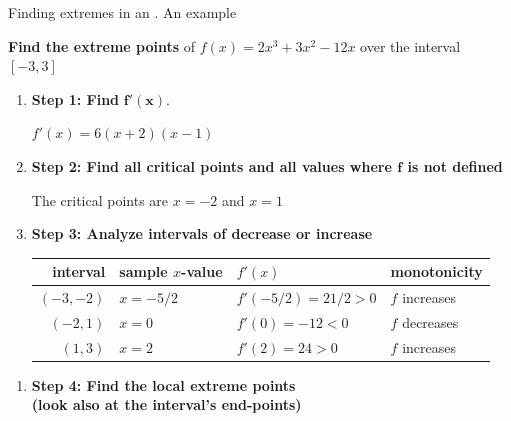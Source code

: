 \documentclass[9pt]{beamer}
\begin{document}
\begin{frame}{Finding  extremes in an . An example}

    {\hspace{0.1cm}
    \textbf{Find the  extreme points} of \href{https://www.desmos.com/calculator/s3vwtug8pu}{$f(x) = 2x^3 + 3x^2 - 12x$} over the interval $[-3, 3]$
    }
    
    \begin{enumerate}[leftmargin = 0.2cm, label = , rightmargin = 0.1cm]

        \item \textbf{Step 1: Find} $\pmb{f'(x)}$.

        $f'(x) = 6(x+2)(x-1)$

        \item \textbf{Step 2: Find all critical points and all values where $\pmb{f}$ is not defined}

        The critical points are $x = -2$ and $x = 1$

        \item \textbf{Step 3: Analyze intervals of decrease or increase}

        \begin{table}
        \begin{flushleft}
        \begin{tabular}{r|lll}
            interval    & sample $x$-value  & $f'(x)$               & monotonicity \\ \hline
            $(-3, -2)$  & $x = -5/2$        & $f'(-5/2) = 21/2 > 0$ & $f$ increases \\
            $(-2, 1)$   & $x = 0$           & $f'(0) = -12 < 0$      & $f$ decreases \\
            $(1, 3)$    & $x = 2$           & $f'(2) = 24 > 0$      & $f$ increases
        \end{tabular}
        \end{flushleft}
        \end{table}

    \end{enumerate}

        \begin{minipage}{0.53\textwidth}
            
            \begin{enumerate}[leftmargin = 0.2cm, label = , rightmargin = 0.1cm]
            
            \item \textbf{Step 4: Find the local extreme points \\ 
            (look also at the interval's end-points)}
        

\end{enumerate}
\end{minipage}
\end{frame}
\end{document}
